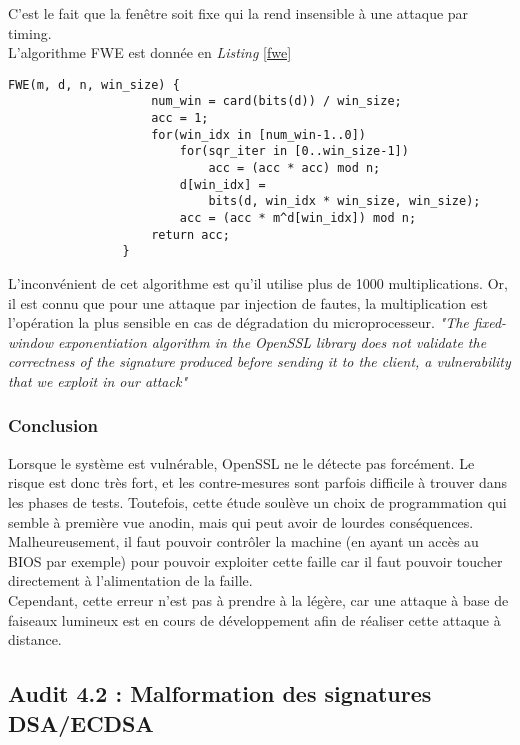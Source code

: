 			C'est le fait que la fenêtre soit fixe qui la rend insensible à une attaque par timing.\\

			L'algorithme FWE est donnée en \textit{Listing} \ref{fwe}
		
			\begin{lstlisting}[style=customc,caption=fwe.c, label=fwe]
				FWE(m, d, n, win_size) {
					num_win = card(bits(d)) / win_size;
					acc = 1;
					for(win_idx in [num_win-1..0])
						for(sqr_iter in [0..win_size-1])
							acc = (acc * acc) mod n;
						d[win_idx] =
							bits(d, win_idx * win_size, win_size);
						acc = (acc * m^d[win_idx]) mod n;
					return acc;
				}
			\end{lstlisting}
		

			L'inconvénient de cet algorithme est qu'il utilise plus de 1000 multiplications. Or, il est connu que pour une attaque par injection de fautes, la multiplication est l'opération la plus sensible en cas de dégradation du microprocesseur. \textit{"The fixed-window exponentiation algorithm in the OpenSSL library does not validate the correctness of the signature produced before sending it to the client, a vulnerability that we exploit in our attack"}\\
			

		\subsubsection{Conclusion}

			Lorsque le système est vulnérable, OpenSSL ne le détecte pas forcément. Le risque est donc très fort, et les contre-mesures sont parfois difficile à trouver dans les phases de tests. Toutefois, cette étude soulève un choix de programmation qui semble à première vue anodin, mais qui peut avoir de lourdes conséquences.\\

			Malheureusement, il faut pouvoir contrôler la machine (en ayant un accès au BIOS par exemple) pour pouvoir exploiter cette faille car il faut pouvoir toucher directement à l'alimentation de la faille.\\

			Cependant, cette erreur n'est pas à prendre à la légère, car une attaque à base de faiseaux lumineux est en cours de développement afin de réaliser cette attaque à distance.
		
\subsection{Audit 4.2 : Malformation des signatures DSA/ECDSA}
